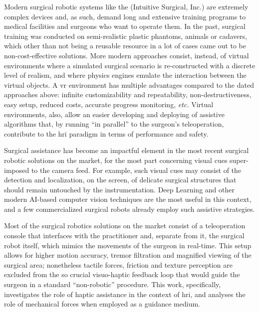 \documentclass[../main.tex]{subfiles}
\begin{document}
Modern surgical robotic systems like the \davinci (Intuitive Surgical, Inc.) are extremely complex devices and, as such, demand long and extensive training programs to medical facilities and surgeons who want to operate them. In the past, surgical training was conducted on semi-realistic plastic phantoms, animals or cadavers, which other than not being a reusable resource in a lot of cases came out to be non-cost-effective solutions. More modern approaches consist, instead, of virtual environments where a simulated surgical scenario is re-constructed with a discrete level of realism, and where physics engines emulate the interaction between the virtual objects. A \ac{vr} environment has multiple advantages compared to the dated approaches above: infinite customizability and repeatability, non-destructiveness, easy setup, reduced costs, accurate progress monitoring, \textit{etc.} Virtual environments, also, allow an easier developing and deploying of assistive algorithms that, by running ``in parallel'' to the surgeon's teleoperation, contribute to the \ac{hri} paradigm in terms of performance and safety. 

Surgical assistance has become an impactful element in the most recent surgical robotic solutions on the market, for the most part concerning visual cues super-imposed to the camera feed. For example, such visual cues may consist of the detection and localization, on the screen, of delicate surgical structures that should remain untouched by the instrumentation. Deep Learning and other modern AI-based computer vision techniques are the most useful in this context, and a few commercialized surgical robots already employ such assistive strategies.

Most of the surgical robotics solutions on the market consist of a teleoperation console that interfaces with the practitioner and, separate from it, the surgical robot itself, which mimics the movements of the surgeon in real-time. This setup allows for higher motion accuracy, tremor filtration and magnified viewing of the surgical area; nonetheless tactile forces, friction and texture perception are excluded from the so crucial visuo-haptic feedback loop that would guide the surgeon in a standard ``non-robotic'' procedure. This work, specifically, investigates the role of haptic assistance in the context of \ac{hri}, and analyses the role of mechanical forces when employed as a guidance medium.
\end{document}
